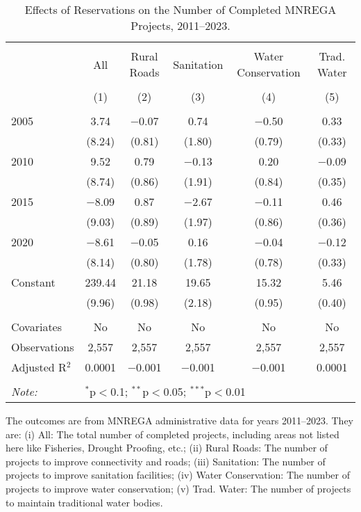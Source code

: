 \begin{table}[!htbp]
\centering
\begin{threeparttable}

  \caption{Effects of Reservations on the Number of Completed MNREGA Projects, 2011--2023.} 
  \label{main_mnrega_2011_2023_additive} 
\scriptsize 
\begin{tabular}{@{\extracolsep{0pt}}lccccc} 
\\[-1.8ex]\hline 
\hline \\[-1.8ex] 
 & All & Rural Roads & Sanitation & Water Conservation & Trad. Water \\ 
\\[-1.8ex] & (1) & (2) & (3) & (4) & (5)\\ 
\hline \\[-1.8ex] 
 2005 & 3.74 & $-$0.07 & 0.74 & $-$0.50 & 0.33 \\ 
  & (8.24) & (0.81) & (1.80) & (0.79) & (0.33) \\ 
  2010 & 9.52 & 0.79 & $-$0.13 & 0.20 & $-$0.09 \\ 
  & (8.74) & (0.86) & (1.91) & (0.84) & (0.35) \\ 
  2015 & $-$8.09 & 0.87 & $-$2.67 & $-$0.11 & 0.46 \\ 
  & (9.03) & (0.89) & (1.97) & (0.86) & (0.36) \\ 
  2020 & $-$8.61 & $-$0.05 & 0.16 & $-$0.04 & $-$0.12 \\ 
  & (8.14) & (0.80) & (1.78) & (0.78) & (0.33) \\ 
  Constant & 239.44 & 21.18 & 19.65 & 15.32 & 5.46 \\ 
  & (9.96) & (0.98) & (2.18) & (0.95) & (0.40) \\ 
 \hline \\[-1.8ex] 
Covariates & No & No & No & No & No \\ 
Observations & 2,557 & 2,557 & 2,557 & 2,557 & 2,557 \\ 
Adjusted R$^{2}$ & 0.0001 & $-$0.001 & $-$0.001 & $-$0.001 & 0.0001 \\ 
\hline 
\hline \\[-1.8ex] 
\textit{Note:}  & \multicolumn{5}{l}{$^{*}$p$<$0.1; $^{**}$p$<$0.05; $^{***}$p$<$0.01} \\ 
\end{tabular} 
\begin{tablenotes}[flushleft]
\scriptsize
\item The outcomes are from MNREGA administrative data for years 2011--2023. They are: 
(i) All: The total number of completed projects, including areas not listed here like Fisheries, Drought Proofing, etc.;
(ii) Rural Roads: The number of projects to improve connectivity and roads;
(iii) Sanitation: The number of projects to improve sanitation facilities;
(iv) Water Conservation: The number of projects to improve water conservation;
(v) Trad. Water: The number of projects to maintain traditional water bodies.
\end{tablenotes}
\end{threeparttable}
\end{table}
